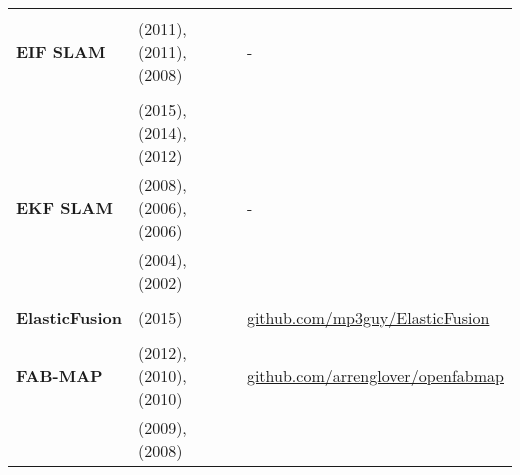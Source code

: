 \documentclass[a4paper,12pt]{scrartcl}
\begin{document}
{\begin{longtable}{l|l|l}
                           &                                                                                             &                                                                       \\ [-3mm]
    \textbf{EIF SLAM}      & \cite{He2011} (2011), \cite{AuatCheein2011} (2011), \cite{Zhou2008} (2008)                  & -                                                                     \\
                           &                                                                                             &                                                                       \\ [-3mm]
                           & \cite{Samsuri2015} (2015), \cite{Sola2014} (2014), \cite{Kurt-Yavuz2012} (2012)             &                                                                       \\
    \textbf{EKF SLAM}      & \cite{Paz2008} (2008), \cite{Bailey2006} (2006), \cite{Bailey2006a} (2006)                  & -                                                                     \\
                           & \cite{Riisgaard2004} (2004), \cite{Thrun1999} (2002)                                        &                                                                       \\
                           &                                                                                             &                                                                       \\ [-3mm]
    \textbf{ElasticFusion} & \cite{Whelan2015} (2015)                                                                    & {\url{github.com/mp3guy/ElasticFusion}}                               \\
                           &                                                                                             &                                                                       \\ [-3mm]
    \textbf{FAB-MAP}       & \cite{Glover2012} (2012), \cite{Glover2010} (2010), \cite{Paul2010} (2010)                  & {\url{github.com/arrenglover/openfabmap}}                             \\
                           & \cite{Cummins2009} (2009), \cite{Cummins2008} (2008)                                        &                                                                       \\

\end{longtable}}
\end{document}
